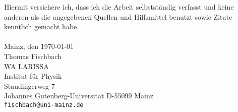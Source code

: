 \thispagestyle{empty}
Hiermit versichere ich, dass ich die Arbeit selbstständig verfasst und keine
anderen als die angegebenen Quellen und Hilfsmittel benutzt sowie
Zitate kenntlich gemacht habe.
\\
\\[3.5cm]
Mainz, den \today\\

\vfill 
\noindent
Thomas Fischbach\\
WA LARISSA\\
Institut für Physik\\
Staudingerweg 7\\
Johannes Gutenberg-Universität
D-55099 Mainz\\
{\tt fischbach@uni-mainz.de}